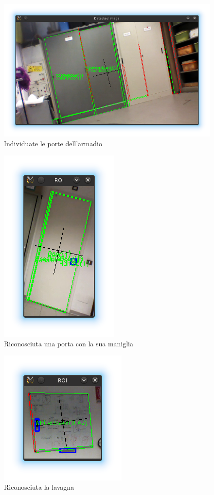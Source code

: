 \begin{figure}[ht]
  \includegraphics[width=\textwidth]{immagini/risultati/detection}
  \caption[Individuazione degli oggetti]{Individuate le porte dell'armadio}
  \label{fig:detection}
\end{figure}

\begin{figure}[ht]
  \centering
  \includegraphics{immagini/risultati/recognition1}
  \caption[Riconoscimento della porta]{Riconosciuta una porta con la sua maniglia}
  \label{fig:recognition1}
\end{figure}

\begin{figure}[ht]
  \centering
  \includegraphics{immagini/risultati/recognition2}
  \caption[Riconoscimento della lavagna]{Riconosciuta la lavagna}
  \label{fig:recognition2}
\end{figure}

